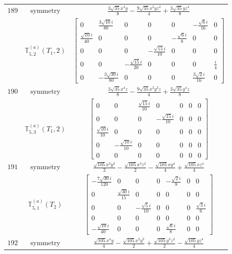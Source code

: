 \documentclass[fleqn,8pt,landscape]{jsarticle}
\begin{document}
\begin{longtable}{ccc}
$ 189 $ & $ \text{symmetry} $ & $ \frac{3 \sqrt{35} x^{4} y}{8} - \frac{9 \sqrt{35} x^{2} y z^{2}}{4} + \frac{3 \sqrt{35} y z^{4}}{8} $ \\
$  $ & $ \mathbb{T}_{5,2}^{(a)}(T_{1},2) $ & $ \begin{bmatrix} 0 & \frac{3 \sqrt{10} i}{80} & 0 & 0 & 0 & - \frac{\sqrt{6} i}{16} & 0 \\ \frac{\sqrt{10} i}{40} & 0 & 0 & 0 & - \frac{\sqrt{6} i}{8} & 0 & 0 \\ 0 & 0 & 0 & - \frac{\sqrt{15} i}{10} & 0 & 0 & 0 \\ 0 & 0 & - \frac{\sqrt{15} i}{20} & 0 & 0 & 0 & \frac{i}{4} \\ 0 & - \frac{3 \sqrt{30} i}{80} & 0 & 0 & 0 & \frac{3 \sqrt{2} i}{16} & 0 \end{bmatrix} $ \\ \hline
$ 190 $ & $ \text{symmetry} $ & $ \frac{3 \sqrt{35} x^{4} z}{8} - \frac{9 \sqrt{35} x^{2} y^{2} z}{4} + \frac{3 \sqrt{35} y^{4} z}{8} $ \\
$  $ & $ \mathbb{T}_{5,3}^{(a)}(T_{1},2) $ & $ \begin{bmatrix} 0 & 0 & \frac{\sqrt{15} i}{10} & 0 & 0 & 0 & 0 \\ 0 & 0 & 0 & - \frac{\sqrt{15} i}{10} & 0 & 0 & 0 \\ \frac{\sqrt{10} i}{10} & 0 & 0 & 0 & 0 & 0 & 0 \\ 0 & - \frac{\sqrt{10} i}{10} & 0 & 0 & 0 & 0 & 0 \\ 0 & 0 & 0 & 0 & 0 & 0 & 0 \end{bmatrix} $ \\ \hline
$ 191 $ & $ \text{symmetry} $ & $ \frac{\sqrt{105} x^{3} y^{2}}{2} - \frac{\sqrt{105} x^{3} z^{2}}{2} - \frac{\sqrt{105} x y^{4}}{4} + \frac{\sqrt{105} x z^{4}}{4} $ \\
$  $ & $ \mathbb{T}_{5,1}^{(a)}(T_{2}) $ & $ \begin{bmatrix} - \frac{7 \sqrt{30} i}{120} & 0 & 0 & 0 & - \frac{\sqrt{2} i}{8} & 0 & 0 \\ 0 & \frac{\sqrt{30} i}{15} & 0 & 0 & 0 & 0 & 0 \\ 0 & 0 & - \frac{\sqrt{5} i}{10} & 0 & 0 & 0 & \frac{\sqrt{3} i}{6} \\ 0 & 0 & 0 & 0 & 0 & 0 & 0 \\ - \frac{\sqrt{10} i}{40} & 0 & 0 & 0 & \frac{\sqrt{6} i}{8} & 0 & 0 \end{bmatrix} $ \\ \hline
$ 192 $ & $ \text{symmetry} $ & $ \frac{\sqrt{105} x^{4} y}{4} - \frac{\sqrt{105} x^{2} y^{3}}{2} + \frac{\sqrt{105} y^{3} z^{2}}{2} - \frac{\sqrt{105} y z^{4}}{4} $ \\

\end{longtable}
\end{document}
